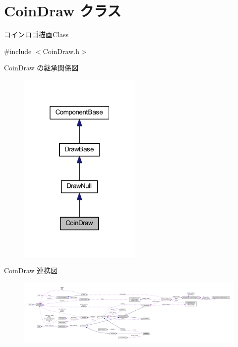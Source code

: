 \hypertarget{class_coin_draw}{}\section{Coin\+Draw クラス}
\label{class_coin_draw}


コインロゴ描画\+Class  




{\ttfamily \#include $<$Coin\+Draw.\+h$>$}



Coin\+Draw の継承関係図\nopagebreak
\begin{figure}[H]
\begin{center}
\leavevmode
\includegraphics[width=169pt]{class_coin_draw__inherit__graph}
\end{center}
\end{figure}


Coin\+Draw 連携図\nopagebreak
\begin{figure}[H]
\begin{center}
\leavevmode
\includegraphics[width=350pt]{class_coin_draw__coll__graph}
\end{center}
\end{figure}
